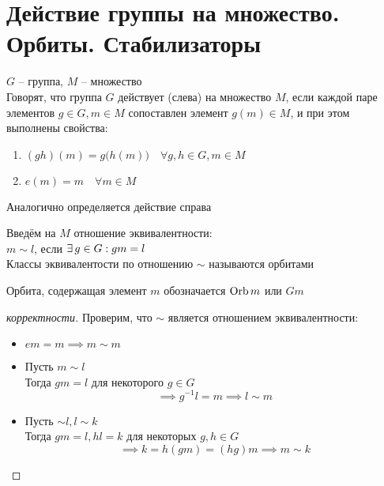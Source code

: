 \section{Действие группы на множество. Орбиты. Стабилизаторы}

\begin{definition}
	$ G $ -- группа, $ M $ -- множество \\
	Говорят, что группа $ G $ действует (слева) на множество $ M $, если каждой паре элементов $ g \in G, m \in M $ сопоставлен элемент $ g(m) \in M $, и при этом выполнены свойства:
	\begin{enumerate}
		\item $ (gh)(m) = g \big( h(m) \big) \quad \forall g, h \in G, m \in M $
		\item $ e(m) = m \quad \forall m \in M $
	\end{enumerate}
\end{definition}

\begin{note}
	Аналогично определяется действие справа
\end{note}

\begin{definition}
	Введём на $ M $ отношение эквивалентности: \\
	$ m \sim l $, если $ \exists\, g \in G : gm = l $ \\
	Классы эквивалентости по отношению $ \sim $ называются орбитами
\end{definition}

\begin{notation}
	Орбита, содержащая элемент $ m $ обозначается $ \operatorname{Orb} m $ или $ Gm $
\end{notation}

\begin{proof}[корректности]
	Проверим, что $ \sim $ является отношением эквивалентности:
	\begin{itemize}
		\item $ em = m \implies m \sim m $
		\item Пусть $ m \sim l $ \\
		Тогда $ gm = l $ для некоторого $ g \in G $
		$$ \implies g^{-1}l = m \implies l \sim m $$
		\item Пусть $ \sim l, l \sim k $ \\
		Тогда $ gm = l, hl = k $ для некоторых $ g, h \in G $
		$$ \implies k = h(gm) = (hg)m \implies m \sim k $$
	\end{itemize}
\end{proof}

